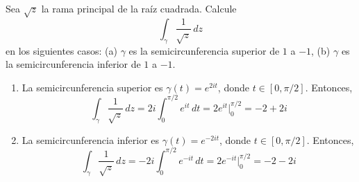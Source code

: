 \begin{exercise}
Sea $\sqrt z$ la rama principal de la raíz cuadrada. Calcule
$$\int_\gamma \frac 1 {\sqrt z} \, dz$$
en los siguientes casos: (a) $\gamma$ es la semicircunferencia superior de $1$ a $-1$, (b) $\gamma$ es la semicircunferencia inferior de $1$ a $-1$.
\end{exercise}

\begin{solution}
\leavevmode
\begin{enumerate}[label=(\alph*)]
    \item La semicircunferencia superior es $\gamma(t) = e^{2it}$, donde $t \in [0, \pi/2]$. Entonces,
    $$\int_\gamma \frac 1 {\sqrt z} \, dz = 2i \int_0^{\pi/2} e^{it} \, dt = 2e^{it} \Big \vert_0^{\pi/2} = -2 + 2i$$
    
    \item La semicircunferencia inferior es $\gamma(t) = e^{-2it}$, donde $t \in [0, \pi/2]$. Entonces,
    $$\int_\gamma \frac 1 {\sqrt z} \, dz = -2i \int_0^{\pi/2} e^{-it} \, dt = 2e^{-it} \Big \vert_0^{\pi/2} = -2 - 2i$$
\end{enumerate}
\end{solution}
